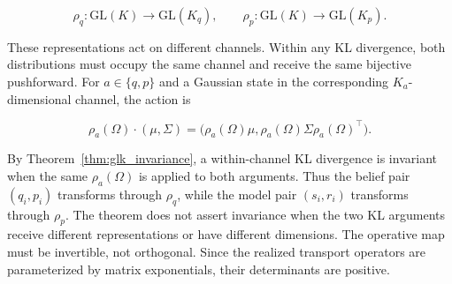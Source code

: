 \documentclass[twoside,11pt]{article}
\begin{document}
\begin{equation}
\rho_q: \mathrm{GL}(K) \to \mathrm{GL}(K_q),
\qquad
\rho_p: \mathrm{GL}(K) \to \mathrm{GL}(K_p).
\label{eq:representations}
\end{equation}

These representations act on different channels. Within any KL divergence, both distributions must occupy the same channel and receive the same bijective pushforward. For $a\in\{q,p\}$ and a Gaussian state in the corresponding $K_a$-dimensional channel, the action is

\begin{equation}
\boxed{
\rho_a(\Omega) \cdot (\mu, \Sigma)
= \big(\rho_a(\Omega)\mu,
\rho_a(\Omega)\Sigma\rho_a(\Omega)^\top\big).
}
\label{eq:gauge_action_gaussians}
\end{equation}

By Theorem~\ref{thm:glk_invariance}, a within-channel KL divergence is invariant when the same $\rho_a(\Omega)$ is applied to both arguments. Thus the belief pair $(q_i,p_i)$ transforms through $\rho_q$, while the model pair $(s_i,r_i)$ transforms through $\rho_p$. The theorem does not assert invariance when the two KL arguments receive different representations or have different dimensions. The operative map must be invertible, not orthogonal. Since the realized transport operators are parameterized by matrix exponentials, their determinants are positive.
\end{document}
